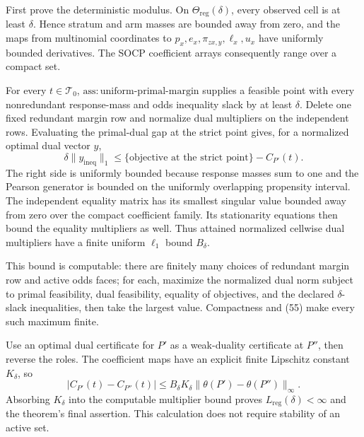 First prove the deterministic modulus. On \(\Theta_{\mathrm{reg}}(\delta)\), every observed cell is at least \(\delta\). Hence stratum and arm masses are bounded away from zero, and the maps from multinomial coordinates to \(p_x,e_x,\pi_{zx,y},\ell_x,u_x\) have uniformly bounded derivatives. The SOCP coefficient arrays consequently range over a compact set.

For every \(t\in\mathcal T_0\), \(\mathrm{ass{:}uniform\mbox{-}primal\mbox{-}margin}\) supplies a feasible point with every nonredundant response-mass and odds inequality slack by at least \(\delta\). Delete one fixed redundant margin row and normalize dual multipliers on the independent rows. Evaluating the primal-dual gap at the strict point gives, for a normalized optimal dual vector \(y\),
\[
\delta\|y_{\mathrm{ineq}}\|_1
\leq \{\text{objective at the strict point}\}-C_{P'}(t). \tag{55}
\]
The right side is uniformly bounded because response masses sum to one and the Pearson generator is bounded on the uniformly overlapping propensity interval. The independent equality matrix has its smallest singular value bounded away from zero over the compact coefficient family. Its stationarity equations then bound the equality multipliers as well. Thus attained normalized cellwise dual multipliers have a finite uniform \(\ell_1\) bound \(B_\delta\).

This bound is computable: there are finitely many choices of redundant margin row and active odds faces; for each, maximize the normalized dual norm subject to primal feasibility, dual feasibility, equality of objectives, and the declared \(\delta\)-slack inequalities, then take the largest value. Compactness and (55) make every such maximum finite.

Use an optimal dual certificate for \(P'\) as a weak-duality certificate at \(P''\), then reverse the roles. The coefficient maps have an explicit finite Lipschitz constant \(K_\delta\), so
\[
|C_{P'}(t)-C_{P''}(t)|
\leq B_\delta K_\delta\|\theta(P')-\theta(P'')\|_\infty. \tag{56}
\]
Absorbing \(K_\delta\) into the computable multiplier bound proves \(L_{\mathrm{reg}}(\delta)<\infty\) and the theorem's final assertion. This calculation does not require stability of an active set.

